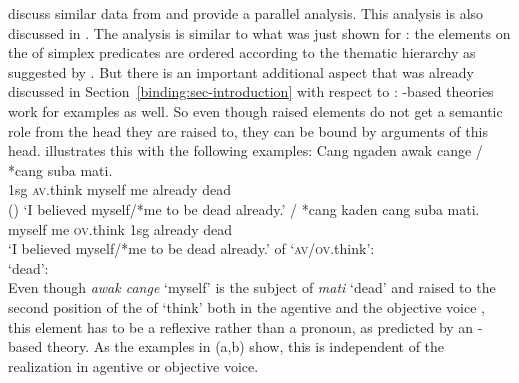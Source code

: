 \documentclass[output=paper,biblatex,babelshorthands,newtxmath,draftmode,colorlinks,citecolor=brown]{langscibook}
\begin{document}
\largerpage
\citet{WA98a-u} discuss similar data from  and provide a parallel analysis. This
analysis is also discussed in . The
analysis is similar to what was just shown for : the elements on the \argstl of
simplex predicates are ordered according to the thematic hierarchy as suggested by
\citet{Jackendoff72a-u}. But there is an important additional aspect that was already discussed in
Section~\ref{binding:sec-introduction} with respect to : \argst-based theories work for  examples as
well. So even though raised elements do not get a semantic role from the head they are raised to,
they can be bound by arguments of this head. \citet[--190]{Wechsler99a} illustrates this with the
following examples:
\eal
\ex
\gll Cang ngaden           {awak cange} /  *cang          suba    mati.\\
     1sg \textsc{av}.think myself    {} \hphantom{*}me already dead\\\hfill()
\glt `I believed myself/*me to be dead already.'
\ex
{} / *cang           kaden             cang suba    mati.\\
     myself       {} \hphantom{*}me \textsc{ov}.think 1sg  already dead\\
\glt `I believed myself/*me to be dead already.'
\ex \argst of `\textsc{av}/\textsc{ov}.think':\\
\ex `dead':\\
\zl
Even though \emph{awak cange} `myself' is the subject of \emph{mati} `dead' and raised to the second
position of the \argst of `think' both in the agentive and the objective voice , this element has to be
a reflexive rather than a pronoun, as predicted by an \argst-based theory. As the examples in
(a,b) show, this is independent of the realization in agentive or objective voice.
\end{document}
